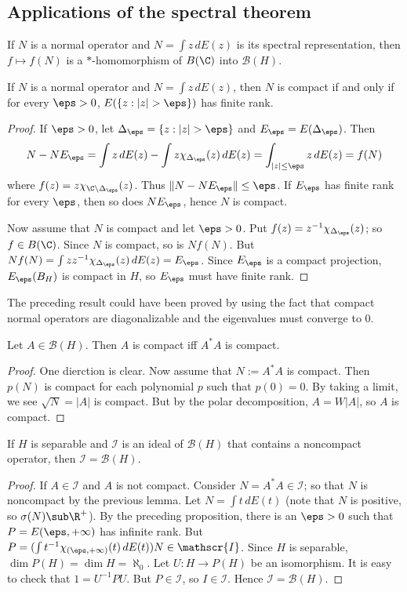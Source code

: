 \subsection{Applications of the spectral theorem}
If $N$ is a normal operator and $N=\int z\,dE(z)$ is its spectral representation, then $f\mapsto f(N)$ is a $*$-homomorphism of $B(\C)$ into $\mathcal{B}(H)$.
\begin{proposition}\label{Hilbert space normal operator compact iff}
If $N$ is a normal operator and $N=\int z\,dE(z)$, then $N$ is compact if and only if for every $\eps>0$, $E(\{z:|z|>\eps\})$ has finite rank.
\end{proposition}
\begin{proof}
If $\eps>0$, let $\Delta_\eps=\{z:|z|>\eps\}$ and $E_\eps=E(\Delta_\eps)$. Then
\[N-NE_\eps=\int z\,dE(z)-\int z\chi_{\Delta_\eps}(z)\,dE(z)=\int_{|z|\leq\eps}z\,dE(z)=f(N)\]
where $f(z)=z\chi_{\C\setminus\Delta_\eps}(z)$. Thus $\|N-NE_\eps\|\leq\eps$. If $E_\eps$ has finite rank for every $\eps$, then so does $NE_\eps$, hence $N$ is compact.\par
Now assume that $N$ is compact and let $\eps>0$. Put $f(z)=z^{-1}\chi_{\Delta_\eps}(z)$; so $f\in B(\C)$. Since $N$ is compact, so is $Nf(N)$. But $Nf(N)=\int zz^{-1}\chi_{\Delta_\eps}(z)\,dE(z)=E_\eps$. Since $E_\eps$ is a compact projection, $E_\eps(B_H)$ is compact in $H$, so $E_\eps$ must have finite rank.
\end{proof}
The preceding result could have been proved by using the fact that compact normal operators are diagonalizable and the eigenvalues must converge to $0$.
\begin{lemma}\label{Hilbert space A compact iff A^*A compact}
Let $A\in\mathcal{B}(H)$. Then $A$ is compact iff $A^*A$ is compact.
\end{lemma}
\begin{proof}
One dierction is clear. Now assume that $N:=A^*A$ is compact. Then $p(N)$ is compact for each polynomial $p$ such that $p(0)=0$. By taking a limit, we see $\sqrt{N}=|A|$ is compact. But by the polar decomposition, $A=W|A|$, so $A$ is compact.
\end{proof}
\begin{proposition}
If $H$ is separable and $\mathscr{I}$ is an ideal of $\mathcal{B}(H)$ that contains a noncompact operator, then $\mathscr{I}=\mathcal{B}(H)$.
\end{proposition}
\begin{proof}
If $A\in\mathscr{I}$ and $A$ is not compact. Consider $N=A^*A\in\mathscr{I}$; so that $N$ is noncompact by the previous lemma. Let $N=\int t\,dE(t)$ (note that $N$ is positive, so $\sigma(N)\sub\R^+$). By the preceding proposition, there is an $\eps>0$ such that $P=E(\eps,+\infty)$ has infinite rank. But $P=(\int t^{-1}\chi_{(\eps,+\infty)}(t)\,dE(t))N\in\mathscr{I}$. Since $H$ is separable, $\dim P(H)=\dim H=\aleph_0$. Let $U:H\to P(H)$ be an isomorphism. It is easy to check that $1=U^{-1}PU$. But $P\in\mathscr{I}$, so $I\in\mathscr{I}$. Hence $\mathscr{I}=\mathcal{B}(H)$.
\end{proof}
